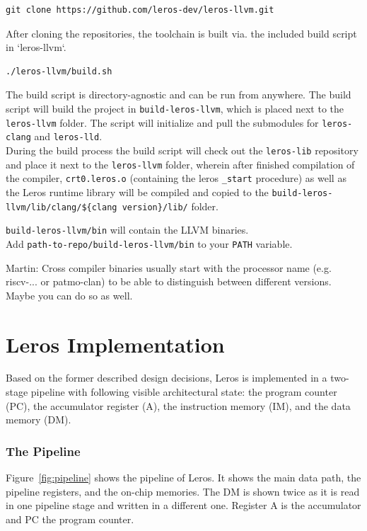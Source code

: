 \documentclass[a4paper,fontsize=10pt,twoside,DIV15,BCOR12mm,headinclude=true,footinclude=false,pagesize,bibtotoc]{scrbook}
\newcommand{\code}[1]{{\small{\texttt{#1}}}}
\newcommand{\martin}[1]{{\color{blue} Martin: #1}}
\begin{document}
\begin{verbatim}
git clone https://github.com/leros-dev/leros-llvm.git
\end{verbatim}

After cloning the repositories, the toolchain is built via. the included build script in `leros-llvm`.
\begin{verbatim}
./leros-llvm/build.sh
\end{verbatim}

The build script is directory-agnostic and can be run from anywhere. The build script will build the project in \texttt{build-leros-llvm}, which is placed next to the \texttt{leros-llvm} folder. The script will initialize and pull the submodules for \texttt{leros-clang} and \texttt{leros-lld}.\\

During the build process the build script will check out the \texttt{leros-lib} repository and place it next to the \texttt{leros-llvm} folder, wherein after finished compilation of the compiler, \texttt{crt0.leros.o} (containing the leros \texttt{\_start} procedure) as well as the Leros runtime library will be compiled and copied to the \texttt{build-leros-llvm/lib/clang/\$\{clang version\}/lib/} folder.

\texttt{build-leros-llvm/bin} will contain the LLVM binaries.\\
Add \code{path-to-repo/build-leros-llvm/bin} to your \code{PATH} variable.

\martin{Cross compiler binaries usually start with the processor name (e.g. riscv-... or patmo-clan)
to be able to distinguish between different versions. Maybe you can do so as well.}

\chapter{Leros Implementation}
\label{sec:imp}

Based on the former described design decisions, Leros is implemented in a two-stage pipeline with following visible architectural state: the program counter (PC), the accumulator register (A), the instruction memory (IM), and the data memory (DM).

\subsection{The Pipeline}

Figure~\ref{fig:pipeline} shows the pipeline of Leros. It shows the main data path, the pipeline registers, and the on-chip memories. The DM is shown twice as it is read in one pipeline stage and written in a different one. Register A is the accumulator and PC the program counter.
\end{document}
